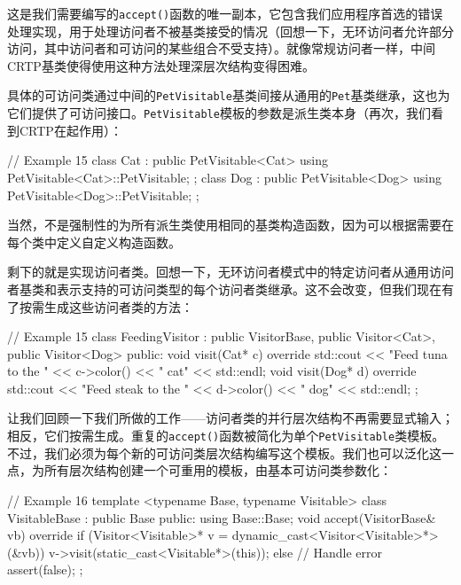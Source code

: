 \begin{code}
{这是我们需要编写的\texttt{accept()}函数的唯一副本，它包含我们应用程序首选的错误处理实现，用于处理访问者不被基类接受的情况（回想一下，无环访问者允许部分访问，其中访问者和可访问的某些组合不受支持）。就像常规访问者一样，中间CRTP基类使得使用这种方法处理深层次结构变得困难。

具体的可访问类通过中间的\texttt{PetVisitable}基类间接从通用的\texttt{Pet}基类继承，这也为它们提供了可访问接口。\texttt{PetVisitable}模板的参数是派生类本身（再次，我们看到CRTP在起作用）：

\begin{code}
// Example 15
class Cat : public PetVisitable<Cat> {
  using PetVisitable<Cat>::PetVisitable;
};
class Dog : public PetVisitable<Dog> {
  using PetVisitable<Dog>::PetVisitable;
};
\end{code}

当然，不是强制性的为所有派生类使用相同的基类构造函数，因为可以根据需要在每个类中定义自定义构造函数。

剩下的就是实现访问者类。回想一下，无环访问者模式中的特定访问者从通用访问者基类和表示支持的可访问类型的每个访问者类继承。这不会改变，但我们现在有了按需生成这些访问者类的方法：

\begin{code}
// Example 15
class FeedingVisitor : public VisitorBase,
                       public Visitor<Cat>,
                       public Visitor<Dog>
{
  public:
  void visit(Cat* c) override {
    std::cout << "Feed tuna to the " << c->color()
              << " cat" << std::endl;
  }
  void visit(Dog* d) override {
    std::cout << "Feed steak to the " << d->color()
              << " dog" << std::endl;
  }
};
\end{code}

让我们回顾一下我们所做的工作——访问者类的并行层次结构不再需要显式输入；相反，它们按需生成。重复的\texttt{accept()}函数被简化为单个\texttt{PetVisitable}类模板。不过，我们必须为每个新的可访问类层次结构编写这个模板。我们也可以泛化这一点，为所有层次结构创建一个可重用的模板，由基本可访问类参数化：

\begin{code}
// Example 16
template <typename Base, typename Visitable>
class VisitableBase : public Base {
  public:
  using Base::Base;
  void accept(VisitorBase& vb) override {
    if (Visitor<Visitable>* v = 
        dynamic_cast<Visitor<Visitable>*>(&vb)) {
      v->visit(static_cast<Visitable*>(this));
    } else { // Handle error
      assert(false);
    }
  }
};
\end{code}

}
\end{code}
